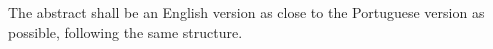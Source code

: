 \begin{resumo}[Abstract]
        
        The abstract shall be an English version as close to the Portuguese version as possible, following the same structure.
\end{resumo}